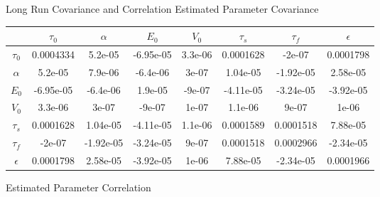 \begin{frame}{Long Run Covariance and Correlation}
\centering
Estimated Parameter Covariance 

\begin{table}[t]
\tiny
\begin{tabular}{|c | c  c  c  c  c  c  c |}
\hline
  & $\tau_0$ & $\alpha$ & $E_0$    & $V_0$    & $\tau_s$ & $\tau_f$ & $\epsilon$ \\
\hline
\rowcolor[gray]{.8} $\tau_0$  & 0.0004334 & 5.2e-05 & -6.95e-05 & 3.3e-06 & 0.0001628 & -2e-07 & 0.0001798 \\
$\alpha$                      & 5.2e-05 & 7.9e-06 & -6.4e-06 & 3e-07 & 1.04e-05 & -1.92e-05 & 2.58e-05 \\
\rowcolor[gray]{.8} $E_0$     & -6.95e-05 & -6.4e-06 & 1.9e-05 & -9e-07 & -4.11e-05 & -3.24e-05 & -3.92e-05 \\
$V_0$                         & 3.3e-06 & 3e-07 & -9e-07 & 1e-07 & 1.1e-06 & 9e-07 & 1e-06 \\
\rowcolor[gray]{.8} $\tau_s$  & 0.0001628 & 1.04e-05 & -4.11e-05 & 1.1e-06 & 0.0001589 & 0.0001518 & 7.88e-05 \\
$\tau_f$                      & -2e-07 & -1.92e-05 & -3.24e-05 & 9e-07 & 0.0001518 & 0.0002966 & -2.34e-05 \\
\rowcolor[gray]{.8} $\epsilon$& 0.0001798 & 2.58e-05 & -3.92e-05 & 1e-06 & 7.88e-05 & -2.34e-05 & 0.0001966 \\
\hline
\end{tabular}
\label{tab:long_cov}
\end{table}

Estimated Parameter Correlation 


\end{frame}
